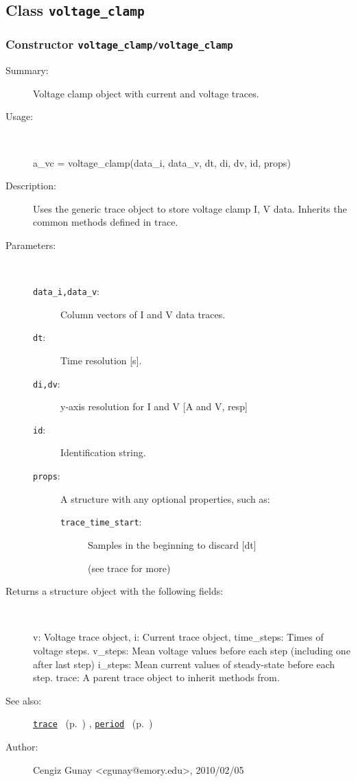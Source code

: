 \subsection{Class \texttt{voltage\_clamp}}%
%
\label{ref_voltage_clamp}%
\hypertarget{ref_voltage_clamp}{}%
\subsubsection[Constructor \texttt{voltage\_clamp}]{Constructor \texttt{voltage\_clamp/voltage\_clamp}}%
%
\label{ref_voltage_clamp__voltage_clamp}%
\hypertarget{ref_voltage_clamp__voltage_clamp}{}%
\begin{description}
\item[Summary:]Voltage clamp object with current and voltage traces.
%
\item[Usage:]~%
\begin{lyxcode}%
a\_vc = voltage\_clamp(data\_i, data\_v, dt, di, dv, id, props)
%
\end{lyxcode}%
%
\item[Description:]%
Uses the generic trace object to store voltage clamp I, V data.
 Inherits the common methods defined in trace.
\item[Parameters:]~
\begin{description}%
\item[\texttt{data\_i,data\_v}:]
 Column vectors of I and V data traces.
\item[\texttt{dt}:]
 Time resolution [s].
\item[\texttt{di,dv}:]
 y-axis resolution for I and V [A and V, resp]
\item[\texttt{id}:]
 Identification string.
\item[\texttt{props}:]
 A structure with any optional properties, such as:
\begin{description}%
\item[\texttt{trace\_time\_start}:]
 Samples in the beginning to discard [dt]

(see trace for more)
\end{description}%
\end{description}%
%
\item[Returns a structure object with the following fields:
]~

   v: Voltage trace object, 
   i: Current trace object,
   time\_steps: Times of voltage steps.
   v\_steps: Mean voltage values before each step (including one after
            last step)
   i\_steps: Mean current values of steady-state before each step.
   trace: A parent trace object to inherit methods from.
%
%
\item[See also:]%
\hyperlink{ref_trace}{\texttt{trace}}%
\ (p.~\pageref{ref_trace})%
%
, \hyperlink{ref_period}{\texttt{period}}%
\ (p.~\pageref{ref_period})%
%
%
\item[Author:]%
Cengiz Gunay <cgunay@emory.edu>, 2010/02/05
%
\end{description}
\methodline%
